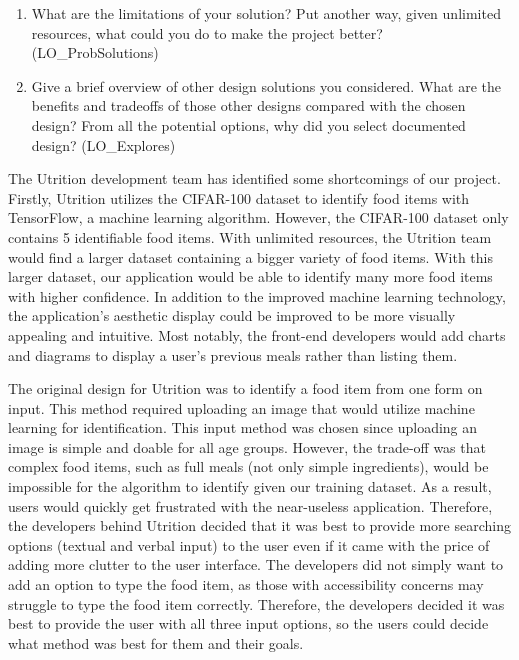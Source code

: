 \documentclass[12pt, titlepage]{article}
\begin{document}
\begin{enumerate}
  \item What are the limitations of your solution?  Put another way, given
  unlimited resources, what could you do to make the project better? (LO\_ProbSolutions)
  \item Give a brief overview of other design solutions you considered.  What
  are the benefits and tradeoffs of those other designs compared with the chosen
  design?  From all the potential options, why did you select documented design?
  (LO\_Explores)
\end{enumerate}

The Utrition development team has identified some shortcomings of our project. Firstly, Utrition utilizes the CIFAR-100 dataset to identify food items with TensorFlow, a machine learning algorithm. However, the CIFAR-100 dataset only contains 5 identifiable food items. With unlimited resources, the Utrition team would find a larger dataset containing a bigger variety of food items. With this larger dataset, our application would be able to identify many more food items with higher confidence. In addition to the improved machine learning technology, the application's aesthetic display could be improved to be more visually appealing and intuitive. Most notably, the front-end developers would add charts and diagrams to display a user's previous meals rather than listing them.

The original design for Utrition was to identify a food item from one form on input. This method required uploading an image that would utilize machine learning for identification. This input method was chosen since uploading an image is simple and doable for all age groups. However, the trade-off was that complex food items, such as full meals (not only simple ingredients), would be impossible for the algorithm to identify given our training dataset. As a result, users would quickly get frustrated with the near-useless application. Therefore, the developers behind Utrition decided that it was best to provide more searching options (textual and verbal input) to the user even if it came with the price of adding more clutter to the user interface. The developers did not simply want to add an option to type the food item, as those with accessibility concerns may struggle to type the food item correctly. Therefore, the developers decided it was best to provide the user with all three input options, so the users could decide what method was best for them and their goals.
\end{document}
